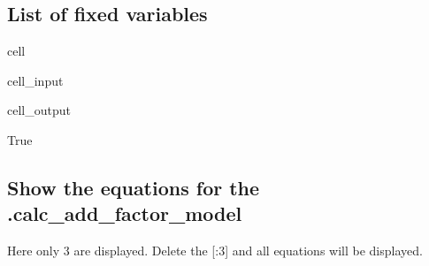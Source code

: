 \documentclass[letterpaper,10pt,english]{jupyterBook}
\begin{document}
\subsection{List of fixed variables}
\label{\detokenize{content/07_MoreFeatures/modelwidgets:list-of-fixed-variables}}
\begin{sphinxuseclass}{cell}\begin{sphinxVerbatimInput}

\begin{sphinxuseclass}{cell_input}
\begin{sphinxVerbatim}[commandchars=\\\{\}]
\end{sphinxVerbatim}

\end{sphinxuseclass}\end{sphinxVerbatimInput}
\begin{sphinxVerbatimOutput}

\begin{sphinxuseclass}{cell_output}
\begin{sphinxVerbatim}[commandchars=\\\{\}]
True
\end{sphinxVerbatim}

\end{sphinxuseclass}\end{sphinxVerbatimOutput}

\end{sphinxuseclass}

\subsection{Show the equations for the .calc\_add\_factor\_model}
\label{\detokenize{content/07_MoreFeatures/modelwidgets:show-the-equations-for-the-calc-add-factor-model}}
\sphinxAtStartPar
Here only 3 are displayed. Delete the {[}:3{]} and all equations will be displayed.
\end{document}
